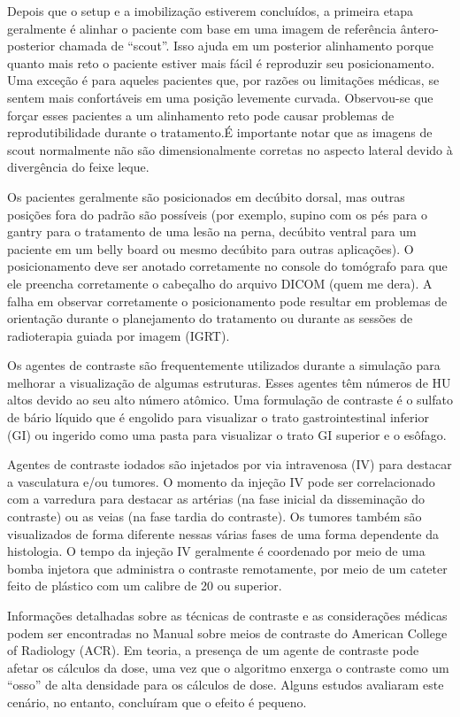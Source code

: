 \documentclass[11pt,a4paper]{article}
\newcounter{exemplo}
\begin{document}
	Depois que o setup e a imobilização estiverem concluídos, a primeira etapa geralmente é alinhar o paciente com base em uma imagem de referência ântero-posterior chamada de “scout”. Isso ajuda em um posterior alinhamento porque quanto mais reto o paciente estiver mais fácil é reproduzir seu posicionamento. Uma exceção é para aqueles pacientes que, por razões ou limitações médicas, se sentem mais confortáveis em uma posição levemente curvada. Observou-se que forçar esses pacientes a um alinhamento reto pode causar problemas de reprodutibilidade durante o tratamento.É importante notar que as imagens de scout normalmente não são dimensionalmente corretas no aspecto lateral devido à divergência do feixe leque. 
	
	Os pacientes geralmente são posicionados em decúbito dorsal, mas outras posições fora do padrão são possíveis (por exemplo, supino com os pés para o gantry para o tratamento de uma lesão na perna, decúbito ventral para um paciente em um belly board ou mesmo decúbito para outras aplicações). O posicionamento deve ser anotado corretamente no console do tomógrafo para que ele preencha corretamente o cabeçalho do arquivo DICOM (quem me dera). A falha em observar corretamente o posicionamento pode resultar em problemas de orientação durante o planejamento do tratamento ou durante as sessões de radioterapia guiada por imagem (IGRT).

	Os agentes de contraste são frequentemente utilizados durante a simulação para melhorar a visualização de algumas estruturas. Esses agentes têm números de HU altos devido ao seu alto número atômico. Uma formulação de contraste é o sulfato de bário líquido que é engolido para visualizar o trato gastrointestinal inferior (GI) ou ingerido como uma pasta para visualizar o trato GI superior e o esôfago.
	
	Agentes de contraste iodados são injetados por via intravenosa (IV) para destacar a vasculatura e/ou tumores. O momento da injeção IV pode ser correlacionado com a varredura para destacar as artérias (na fase inicial da disseminação do contraste) ou as veias (na fase tardia do contraste). Os tumores também são visualizados de forma diferente nessas várias fases de uma forma dependente da histologia. O tempo da injeção IV geralmente é coordenado por meio de uma bomba injetora que administra o contraste remotamente, por meio de um cateter feito de plástico com um calibre de 20 ou superior.
	
	Informações detalhadas sobre as técnicas de contraste e as considerações médicas podem ser encontradas no Manual sobre meios de contraste do American College of Radiology (ACR). Em teoria, a presença de um agente de contraste pode afetar os cálculos da dose, uma vez que o algoritmo enxerga o contraste como um “osso” de alta densidade para os cálculos de dose. Alguns estudos avaliaram este cenário, no entanto, concluíram que o efeito é pequeno.
	
\end{document}
